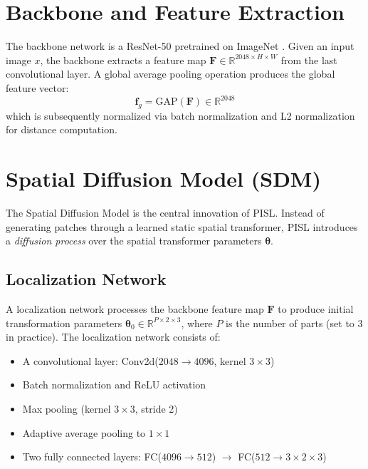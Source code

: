 \section{Backbone and Feature Extraction}

The backbone network is a ResNet-50 \cite{he2016deep} pretrained on ImageNet \cite{deng2009imagenet}. Given an input image $x$, the backbone extracts a feature map $\mathbf{F} \in \mathbb{R}^{2048 \times H \times W}$ from the last convolutional layer. A global average pooling operation produces the global feature vector:
\begin{equation}
    \mathbf{f}_g = \text{GAP}(\mathbf{F}) \in \mathbb{R}^{2048}
\end{equation}
which is subsequently normalized via batch normalization and L2 normalization for distance computation.

\section{Spatial Diffusion Model (SDM)}

The Spatial Diffusion Model is the central innovation of PISL. Instead of generating patches through a learned static spatial transformer, PISL introduces a \textit{diffusion process} over the spatial transformer parameters $\boldsymbol{\theta}$.

\subsection{Localization Network}

A localization network processes the backbone feature map $\mathbf{F}$ to produce initial transformation parameters $\boldsymbol{\theta}_0 \in \mathbb{R}^{P \times 2 \times 3}$, where $P$ is the number of parts (set to 3 in practice). The localization network consists of:
\begin{itemize}
    \item A convolutional layer: Conv2d($2048 \rightarrow 4096$, kernel $3 \times 3$)
    \item Batch normalization and ReLU activation
    \item Max pooling (kernel $3 \times 3$, stride 2)
    \item Adaptive average pooling to $1 \times 1$
    \item Two fully connected layers: FC($4096 \rightarrow 512$) $\rightarrow$ FC($512 \rightarrow 3 \times 2 \times 3$)
\end{itemize}

